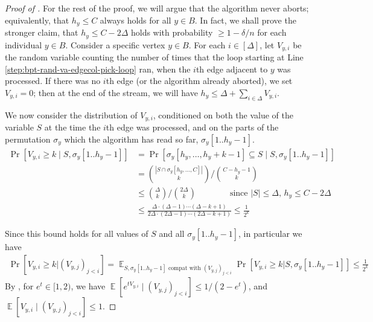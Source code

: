\documentclass[10pt]{article}
\theoremstyle{definition}\newtheorem{definition}[lemma]{Definition}
\theoremstyle{remark}  \newtheorem*{remark}{Remark}
\DeclareMathOperator{\EE}{\mathbb{E}}
\begin{document}
\begin{proof}[Proof of ]
  For the rest of the proof, we will argue that the algorithm never aborts; equivalently,
  that $h_y \le C$ always holds for all $y \in B$. In fact, we shall prove the stronger
  claim, that $h_y \le C - 2 \Delta$ holds with probability $\ge 1 - \delta / n$
  for each individual $y \in B$. Consider a specific vertex $y \in B$.
  For each $i \in [\Delta]$, let $V_{y,i}$
  be the random variable counting the number of times that the loop starting at
  Line \ref{step:bpt-rand-va-edgecol-pick-loop} ran, when the $i$th edge adjacent
  to $y$ was processed. If there was no $i$th edge (or the algorithm already aborted), %
  we set $V_{y,i} = 0$; then at the end of the stream, we will have
  $h_y \le \Delta + \sum_{i\in\Delta} V_{y,i}$.
  
  We now consider the distribution of $V_{y,i}$, conditioned on both the value of the
  variable $S$ at the time the $i$th edge was processed, and on the parts of
  the permutation $\sigma_y$ which the algorithm has read so far, $\sigma_y[1..{h_y-1}]$.
  \begin{align*}
    \Pr[V_{y,i} \ge k \mid S, \sigma_y[1..{h_y-1}]] &= \Pr[\sigma_y[h_y,\ldots,h_y + k - 1] \subseteq S \mid S, \sigma_y[1..{h_y-1}]] \\
      &= \binom{|S \cap \sigma_y[h_y,...,C]|}{k} / \binom{C - h_y - 1}{k}  \\
      & \le \binom{\Delta}{k} / \binom{2 \Delta}{k} \qquad\qquad \text{since $|S|\le\Delta$, $h_y \le C - 2\Delta$} \\
      &\le \frac{\Delta\cdot (\Delta-1) \cdots (\Delta -k +1)}{2\Delta \cdot (2\Delta-1) \cdots (2\Delta -k +1)} \le \frac{1}{2^k}
  \end{align*}
  
  Since this bound holds for all values of $S$ and all $\sigma_y[1..{h_y-1}]$, in particular we
  have
  \begin{align*}
    \Pr[V_{y,i} \ge k | (V_{y,j})_{j < i}] = \EE_{\text{$S,\sigma_y[1..{h_y-1}]$ compat with $(V_{y,j})_{j < i}$}} \Pr[V_{y,i} \ge k |S,\sigma_y[1..{h_y-1}]] \le \frac{1}{2^k}
  \end{align*}
  By , for $e^t \in [1,2)$, we have $\EE[e^{t V_{y,i} } \mid (V_{y,j})_{j < i}] \le 1 / (2 - e^t)$, and $\EE[V_{y,i} \mid (V_{y,j})_{j < i}] \le 1$.
  

\end{proof}
\end{document}

